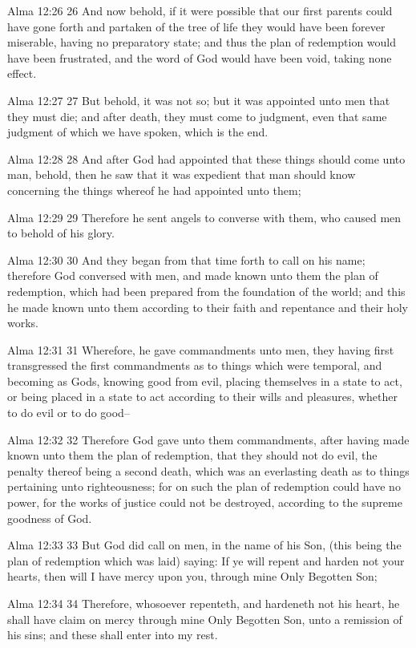 Alma 12:26
 26 And now behold, if it were possible that our first parents
could have gone forth and partaken of the tree of life they would
have been forever miserable, having no preparatory state; and
thus the plan of redemption would have been frustrated, and the
word of God would have been void, taking none effect.

Alma 12:27
 27 But behold, it was not so; but it was appointed unto men that
they must die; and after death, they must come to judgment, even
that same judgment of which we have spoken, which is the end.

Alma 12:28
 28 And after God had appointed that these things should come
unto man, behold, then he saw that it was expedient that man
should know concerning the things whereof he had appointed unto
them;

Alma 12:29
 29 Therefore he sent angels to converse with them, who caused
men to behold of his glory.

Alma 12:30
 30 And they began from that time forth to call on his name;
therefore God conversed with men, and made known unto them the
plan of redemption, which had been prepared from the foundation
of the world; and this he made known unto them according to their
faith and repentance and their holy works.

Alma 12:31
 31 Wherefore, he gave commandments unto men, they having first
transgressed the first commandments as to things which were
temporal, and becoming as Gods, knowing good from evil, placing
themselves in a state to act, or being placed in a state to act
according to their wills and pleasures, whether to do evil or to
do good--

Alma 12:32
 32 Therefore God gave unto them commandments, after having made
known unto them the plan of redemption, that they should not do
evil, the penalty thereof being a second death, which was an
everlasting death as to things pertaining unto righteousness; for
on such the plan of redemption could have no power, for the works
of justice could not be destroyed, according to the supreme
goodness of God.

Alma 12:33
 33 But God did call on men, in the name of his Son, (this being
the plan of redemption which was laid) saying: If ye will repent
and harden not your hearts, then will I have mercy upon you,
through mine Only Begotten Son;

Alma 12:34
 34 Therefore, whosoever repenteth, and hardeneth not his heart,
he shall have claim on mercy through mine Only Begotten Son, unto
a remission of his sins; and these shall enter into my rest.

